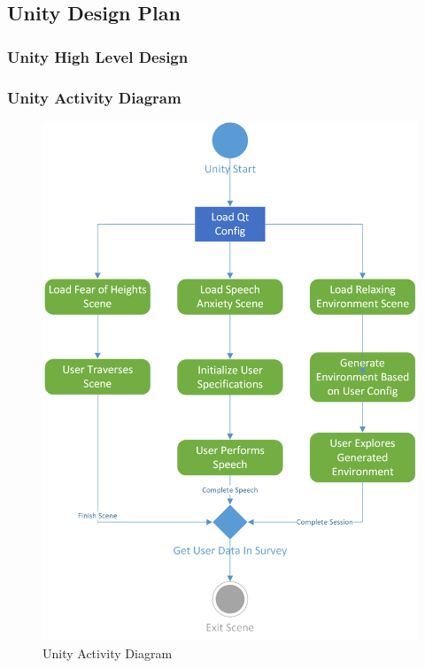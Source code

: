 \documentclass[a4paper,10pt]{article}
\begin{document}
\pagebreak
	\subsection{Unity Design Plan}
		\subsubsection{Unity High Level Design}
		\pagebreak
		\subsubsection{Unity Activity Diagram}
				\begin{figure}[H]
					\centerline{\includegraphics[]{unityActivityDiag.png}}
					\caption{Unity Activity Diagram}
					\label{fig:unityactivity}
				\end{figure}
				\pagebreak
\end{document}
